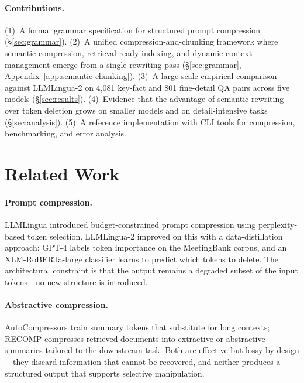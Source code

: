 \documentclass{article}
\begin{document}
\paragraph{Contributions.}
(1)~A formal grammar specification for structured prompt compression (\S\ref{sec:grammar}). (2)~A unified compression-and-chunking framework where semantic compression, retrieval-ready indexing, and dynamic context management emerge from a single rewriting pass (\S\ref{sec:grammar}, Appendix~\ref{app:semantic-chunking}). (3)~A large-scale empirical comparison against LLMLingua-2 on 4{,}081 key-fact and 801 fine-detail QA pairs across five models (\S\ref{sec:results}). (4)~Evidence that the advantage of semantic rewriting over token deletion grows on smaller models and on detail-intensive tasks (\S\ref{sec:analysis}). (5)~A reference implementation with CLI tools for compression, benchmarking, and error analysis.

\section{Related Work}
\label{sec:related}

\paragraph{Prompt compression.}
LLMLingua \citep{jiang2023llmlingua} introduced budget-constrained prompt compression using perplexity-based token selection. LLMLingua-2 \citep{pan2024llmlingua2} improved on this with a data-distillation approach: GPT-4 labels token importance on the MeetingBank corpus, and an XLM-RoBERTa-large classifier learns to predict which tokens to delete. The architectural constraint is that the output remains a degraded subset of the input tokens---no new structure is introduced.

\paragraph{Abstractive compression.}
AutoCompressors \citep{chevalier2023autocompressors} train summary tokens that substitute for long contexts; RECOMP \citep{xu2023recomp} compresses retrieved documents into extractive or abstractive summaries tailored to the downstream task. Both are effective but lossy by design---they discard information that cannot be recovered, and neither produces a structured output that supports selective manipulation.
\end{document}
